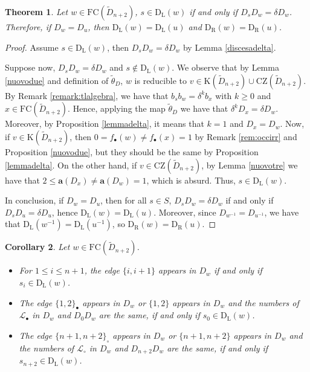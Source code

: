 \documentclass{amsart}
\newcommand{\D}{{\widetilde{D}_{n+2}}}
\newcommand{\ld}{{\mathrm{D}_{\mathrm{L}}}}
\newcommand{\rd}{{\mathrm{D}_{\mathrm{R}}}}
\newcommand{\fc}{{\mathrm{FC}}}
\newcommand{\bO}{{\mathcal{L}_{\bullet}}}
\newcommand{\wO}{{\mathcal{L}_{\circ}}}
\newcommand{\zz}{\mathrm{CZ}}
\newcommand{\car}{\mathrm{K}}
\newtheorem{Theorem}{Theorem}[section]
\newtheorem{Corollary}[Theorem]{Corollary}
\theoremstyle{definition}
\begin{document}
\begin{Theorem}
\label{maindis}
Let $w\in \fc(\D)$, $s\in \ld(w)$ if and only if $D_sD_w=\delta D_w$. Therefore, if $D_w=D_u$, then $\ld(w)=\ld(u)$ and $\rd(w)=\rd(u)$. 
\end{Theorem} 

\begin{proof}
Assume $s\in \ld(w)$, then $D_sD_w=\delta D_w$ by Lemma \ref{discesadelta}. 

Suppose now, $D_sD_w=\delta D_w$ and $s\notin \ld(w)$. We observe that by Lemma \ref{nuovodue} and definition of $\widetilde{\theta}_D$, $w$ is reducible to $v\in \car(\D)\cup \zz(\D)$. By Remark \ref{remark:tlalgebra}, we have that $b_sb_w=\delta ^kb_x$ with $k\ge 0$ and $x\in \fc(\D)$. Hence, applying the map $\widetilde{\theta}_D$ we have that $\delta ^kD_x=\delta D_w$. Moreover, by Proposition \ref{lemmadelta}, it means that $k=1$ and $D_x=D_w$. Now, if $v\in \car(\D)$, then $0=f_\bullet(w)\ne f_\bullet(x)=1$ by Remark \ref{rem:occirr} and Proposition \ref{nuovodue}, but they should be the same by Proposition \ref{lemmadelta}. On the other hand, if $v\in \zz(\D)$, by Lemma \ref{nuovotre} we have that $2\le \mathbf{a}(D_x)\ne\mathbf{a}(D_w)=1$, which is absurd. Thus, $s\in \ld(w)$. 

In conclusion, if $D_w=D_u$, then for all $s\in S$, $D_sD_w=\delta D_w$ if and only if $D_sD_u=\delta D_u$, hence $\ld(w)=\ld(u)$. Moreover, since $D_{w^{-1}}=D_{u^{-1}}$, we have that $\ld(w^{-1})=\ld(u^{-1})$, so $\rd(w)=\rd(u)$. 

\end{proof} 

\begin{Corollary}
\label{corollary:archidiscese}
    Let $w\in \fc(\D)$. 
    \begin{itemize}
        \item[(a)] For $1\le i\le n+1$, the edge $\{i,i+1\}$ appears in $D_w$ if and only if $s_i\in \ld(w)$.
        \item[(b)] The edge $\{1,2\}_{\bullet}$ appears in $D_w$ or $\{1,2\}$ appears in $D_w$ and the numbers of $\bO$ in $D_w$ and $D_{0}D_{w}$ are the same, if and only if $s_0\in \ld(w)$. 
        \item[(c)] The edge $\{n+1,n+2\}_{\circ}$ appears in $D_w$ or $\{n+1,n+2\}$ appears in $D_w$ and the numbers of $\wO$ in $D_w$ and $D_{n+2}D_{w}$ are the same, if and only if $s_{n+2}\in \ld(w)$. 
    \end{itemize}
\end{Corollary}
\end{document}
